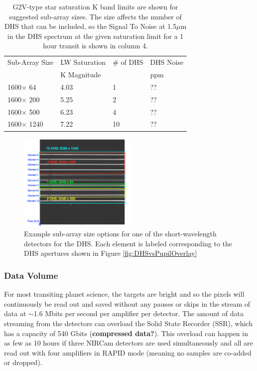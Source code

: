 \documentclass{emulateapj}
\begin{document}
\begin{table}
\centering
\begin{tabular}{llll}
Sub-Array Size &  LW Saturation & \# of DHS & DHS Noise\\
                         &  K Magnitude    &                               & ppm \\
\hline \hline
1600$\times$ 64 & 4.03 & 1 &  ?? \\
1600$\times$ 200 & 5.25 & 2 &  ?? \\
1600$\times$ 500 & 6.23 & 4 &  ?? \\
1600$\times$ 1240 & 7.22 & 10 & ??
\end{tabular}
\caption{G2V-type star saturation K band limits are shown for suggested sub-array sizes. The size affects the number of DHS that can be included, so the Signal To Noise at 1.5$\mu$m in the DHS spectrum at the given saturation limit for a 1 hour transit is shown in column 4.}\label{tab:SatSNRsubA}
\end{table}

\begin{figure}[!ht]
\includegraphics[width=0.5\textwidth]{example_ap_sizes.png}
\caption{Example sub-array size options for one of the short-wavelength detectors for the DHS. Each element is labeled corresponding to the DHS apertures shown in Figure \ref{fig:DHSvsPupilOverlay}}\label{fig:DHSaps}
\end{figure}

\subsubsection{Data Volume}
For most transiting planet science, the targets are bright and so the pixels will continuously be read out and saved without any pauses or skips in the stream of data at $\sim$1.6 Mbits per second per amplifier per detector. The amount of data streaming from the detectors can overload the Solid State Recorder (SSR), which has a capacity of 540 Gbits \citep{johns2008L2comm} (\textbf{compressed data?}). This overload can happen in as few as 10 hours if three NIRCam detectors are used simultaneously and all are read out with four amplifiers in RAPID mode (meaning no samples are co-added or dropped).
\end{document}
